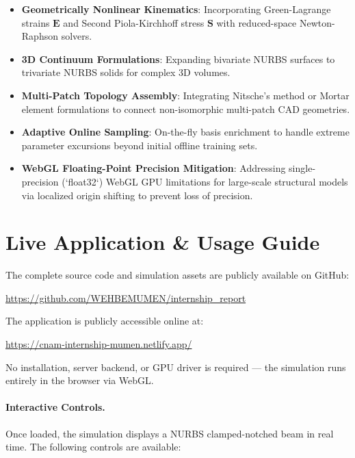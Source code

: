 \begin{itemize}[leftmargin=*]
    \item \textbf{Geometrically Nonlinear Kinematics}: Incorporating Green-Lagrange strains $\mathbf{E}$ and Second Piola-Kirchhoff stress $\mathbf{S}$ with reduced-space Newton-Raphson solvers.
    \item \textbf{3D Continuum Formulations}: Expanding bivariate NURBS surfaces to trivariate NURBS solids for complex 3D volumes.
    \item \textbf{Multi-Patch Topology Assembly}: Integrating Nitsche's method or Mortar element formulations to connect non-isomorphic multi-patch CAD geometries.
    \item \textbf{Adaptive Online Sampling}: On-the-fly basis enrichment to handle extreme parameter excursions beyond initial offline training sets.
    \item \textbf{WebGL Floating-Point Precision Mitigation}: Addressing single-precision (`float32`) WebGL GPU limitations for large-scale structural models via localized origin shifting to prevent loss of precision.
\end{itemize}

\section{Live Application \& Usage Guide}
\label{sec:live_app}

The complete source code and simulation assets are publicly available on GitHub:
\begin{center}
    \url{https://github.com/WEHBEMUMEN/internship_report}
\end{center}

The application is publicly accessible online at:
\begin{center}
    \url{https://cnam-internship-mumen.netlify.app/}
\end{center}
No installation, server backend, or GPU driver is required — the simulation runs entirely in the browser via WebGL.


\paragraph{Interactive Controls.}
Once loaded, the simulation displays a NURBS clamped-notched beam in real time. The following controls are available:

